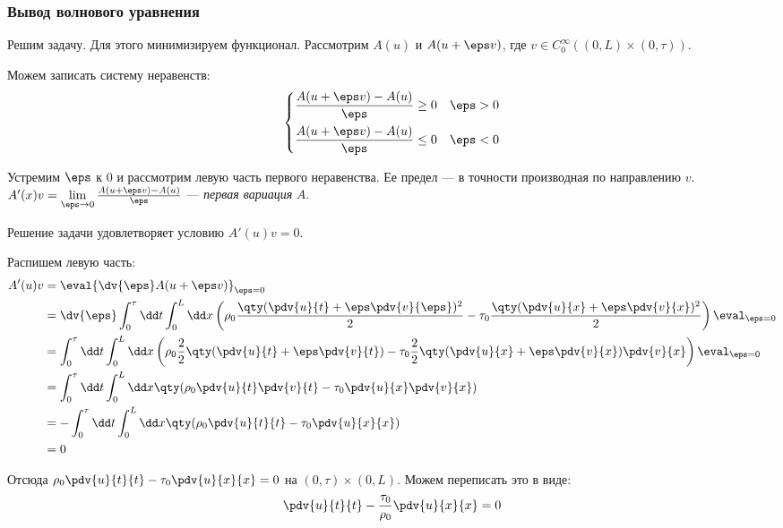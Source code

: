 
\subsubsection{Вывод волнового уравнения}

Решим задачу. Для этого минимизируем функционал. Рассмотрим $A(u)$ и $A(u + \eps v)$, где $v \in C_0^\infty \left((0, L) \times (0, \tau) \right)$.

Можем записать систему неравенств:
%
\begin{equation}
\left\{\begin{aligned}
\frac{A(u + \eps v) - A(u)}{\eps} &\ge 0 && \eps > 0 \\
\frac{A(u + \eps v) - A(u)}{\eps} &\le 0 && \eps < 0
\end{aligned}\right.
\end{equation}

Устремим $\eps$ к $0$ и рассмотрим левую часть первого неравенства. Ее предел --- в точности производная по направлению $v$. $A'(x)v = \lim\limits_{\eps \to 0} \frac{A(u + \eps v) - A(u)}{\eps}$ --- \emph{первая вариация} $A$.

Решение задачи удовлетворяет условию $\boxed{A'(u)v = 0}$.

Распишем левую часть:
\begin{equation}
  \begin{aligned}
    A'(u)v
    &= \eval{\dv{\eps} A(u + \eps v)}_{\eps = 0} \\  
    &= \dv{\eps} \int_0^\tau \dd t \int_0^L \dd x \left(\rho_0 \frac{\qty(\pdv{u}{t} + \eps \pdv{v}{\eps})^2}{2} - \tau_0 \frac{\qty(\pdv{u}{x} + \eps \pdv{v}{x})^2}{2}\right) \eval_{\eps = 0} \\
    &= \int_0^\tau \dd t \int_0^L \dd x \left( \rho_0 \frac{2}{2} \qty(\pdv{u}{t} + \eps \pdv{v}{t}) - \tau_0 \frac{2}{2} \qty(\pdv{u}{x} + \eps \pdv{v}{x}) \pdv{v}{x} \right) \eval_{\eps=0} \\
    &= \int_0^\tau \dd t \int_0^L \dd x \qty(\rho_0 \pdv{u}{t} \pdv{v}{t} - \tau_0 \pdv{u}{x} \pdv{v}{x}) \\
    &= -\int_0^\tau \dd t \int_0^L \dd x \qty(\rho_0 \pdv{u}{t}{t} - \tau_0 \pdv{u}{x}{x}) \\
    &= 0
  \end{aligned}
\end{equation}

Отсюда $\rho_0 \pdv{u}{t}{t} - \tau_0 \pdv{u}{x}{x} = 0$ на $(0, \tau) \times (0, L)$. Можем переписать это в виде:
\begin{equation}
  \pdv{u}{t}{t} - \frac{\tau_0}{\rho_0} \pdv{u}{x}{x} = 0
\end{equation}

